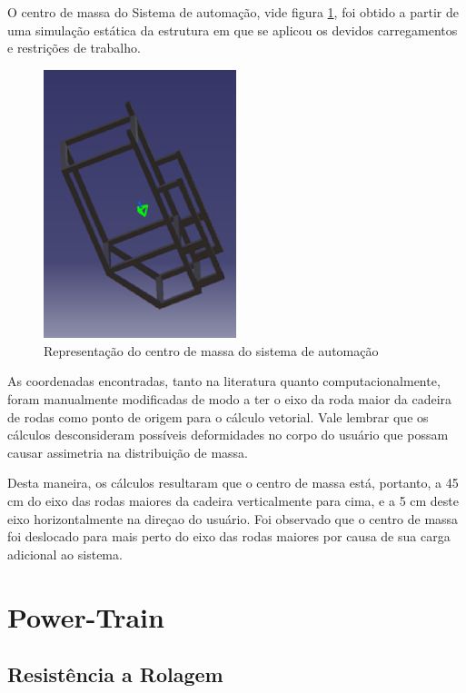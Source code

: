 O centro de massa do Sistema de automação, vide figura \ref{fig:centro_massa_sistema_automocao}, foi obtido a partir de uma simulação estática da estrutura em que se aplicou os devidos carregamentos e restrições de trabalho.

\begin{figure}[!htb]
\centering
\includegraphics[width = 0.5\textwidth]{figuras/resultados/centro_massa_sistema_automocao}
\caption{Representação do centro de massa do sistema de automação}
\label{fig:centro_massa_sistema_automocao}
\end{figure}

As coordenadas encontradas, tanto na literatura quanto computacionalmente, foram manualmente modificadas de modo a ter o eixo da roda maior da cadeira de rodas como ponto de origem para o cálculo vetorial. Vale lembrar que os cálculos desconsideram possíveis deformidades no corpo do usuário que possam causar assimetria na distribuição de massa.

Desta maneira, os cálculos resultaram que o centro de massa está, portanto, a 45 cm do eixo das rodas maiores da cadeira verticalmente para cima, e a 5 cm deste eixo horizontalmente na direçao do usuário. Foi observado que o centro de massa foi deslocado para mais perto do eixo das rodas maiores por causa de sua carga adicional ao sistema.

\section{Power-Train}

\subsection[Resistência a Rolagem]{Resistência a Rolagem}

